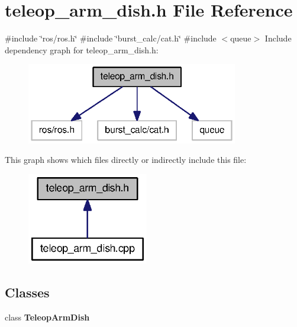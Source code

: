 \section{teleop\-\_\-arm\-\_\-dish.\-h \-File \-Reference}
\label{teleop__arm__dish_8h}
{\ttfamily \#include \char`\"{}ros/ros.\-h\char`\"{}}\*
{\ttfamily \#include \char`\"{}burst\-\_\-calc/cat.\-h\char`\"{}}\*
{\ttfamily \#include $<$queue$>$}\*
\-Include dependency graph for teleop\-\_\-arm\-\_\-dish.\-h\-:\nopagebreak
\begin{figure}[H]
\begin{center}
\leavevmode
\includegraphics[width=262pt]{teleop__arm__dish_8h__incl}
\end{center}
\end{figure}
\-This graph shows which files directly or indirectly include this file\-:\nopagebreak
\begin{figure}[H]
\begin{center}
\leavevmode
\includegraphics[width=150pt]{teleop__arm__dish_8h__dep__incl}
\end{center}
\end{figure}
\subsection*{\-Classes}
\begin{DoxyCompactItemize}
\item 
class {\bf \-Teleop\-Arm\-Dish}
\end{DoxyCompactItemize}
